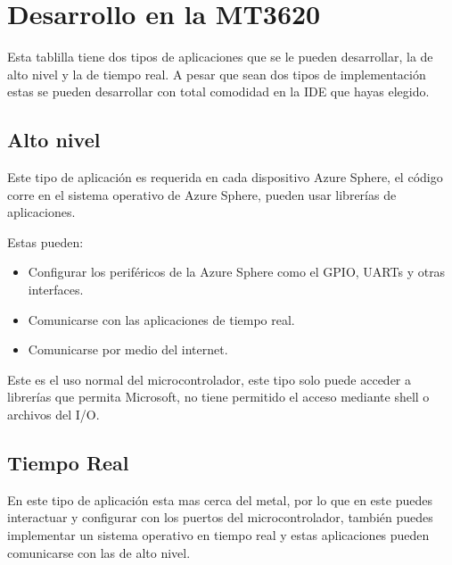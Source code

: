 \section{Desarrollo en la MT3620}
Esta tablilla tiene dos tipos de aplicaciones que se le pueden desarrollar, la de alto nivel y la de tiempo real. A pesar que sean dos tipos de implementación estas se pueden desarrollar con total comodidad en la IDE que hayas elegido.


\subsection{Alto nivel}
Este tipo de aplicación es requerida en cada dispositivo Azure Sphere, el código corre en el sistema operativo de Azure Sphere, pueden usar librerías de aplicaciones.

Estas pueden:
\begin{itemize}
	\item
	Configurar los periféricos de la Azure Sphere como el GPIO, UARTs y otras interfaces.
	\item 
	Comunicarse con las aplicaciones de tiempo real.
	\item 
	Comunicarse por medio del internet.
\end{itemize}

Este es el uso normal del microcontrolador, este tipo solo puede acceder a librerías que permita Microsoft, no tiene permitido el acceso mediante shell o archivos del I/O.

\subsection{Tiempo Real}
En este tipo de aplicación esta mas cerca del metal, por lo que en este puedes interactuar y configurar con los puertos del microcontrolador, también puedes implementar un sistema operativo en tiempo real y estas aplicaciones pueden comunicarse con las de alto nivel.

